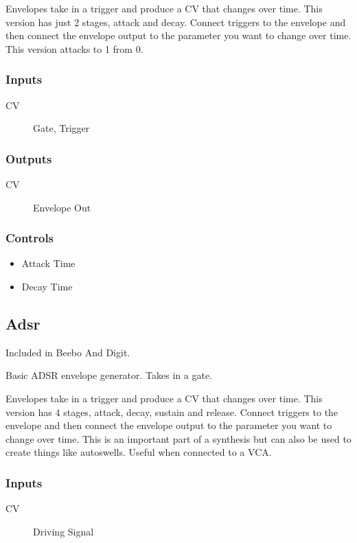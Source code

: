 Envelopes take in a  trigger and produce a CV that changes over time.
                  This version has just 2 stages, attack and decay. Connect triggers to the envelope and then connect the envelope output to the parameter you want to change over time.
                  This version attacks to 1 from 0.

\subsubsection{Inputs}
\begin{description}
\item [CV] Gate, Trigger
\end{description}

\subsubsection{Outputs}
\begin{description}
\item [CV] Envelope Out
\end{description}

\subsubsection{Controls}
\begin{itemize}
\item Attack Time
\item Decay Time
\end{itemize}

\subsection{Adsr}

Included in Beebo And Digit.

Basic ADSR envelope generator. Takes in a gate.

Envelopes take in a  trigger and produce a CV that changes over time.
                  This version has 4 stages, attack, decay, sustain and release. Connect triggers to the envelope and then connect the envelope output to the parameter you want to change over time.
                  This is an important part of a synthesis but can also be used to create things like autoswells. Useful when connected to a VCA.

\subsubsection{Inputs}
\begin{description}
\item [CV] Driving Signal
\end{description}

